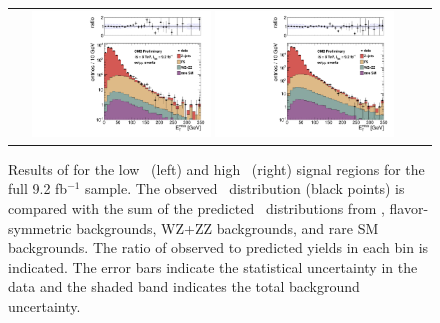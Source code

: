 \begin{figure}[!h]
\begin{center}
\begin{tabular}{cc}
\includegraphics[width=0.45\textwidth]{plots/pfmet_pt40_lowMet_all.pdf}
\includegraphics[width=0.45\textwidth]{plots/pfmet_pt40_highMet_all.pdf}
\end{tabular}
\caption{\footnotesize Results of for the low \MET\ (left) and high \MET\ (right) signal regions for the full 9.2 fb$^{-1}$ sample.
The observed \MET\ distribution (black points) is compared with the sum of the predicted \MET\
distributions from \zjets, flavor-symmetric backgrounds, WZ+ZZ backgrounds, and rare SM backgrounds. 
The ratio of observed to predicted yields in each bin is
indicated. The error bars indicate the statistical uncertainty in the data and the shaded band indicates the total background uncertainty.
\label{fig:results_fulledge}
}
\end{center}
\end{figure}

